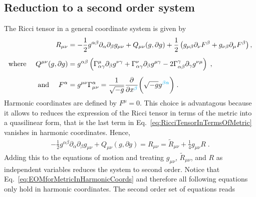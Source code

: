 \documentclass[a4paper,oneside,openany,11pt]{memoir}
\numberwithin{equation}{section} %
\newcommand{\aaron}[1]{{\color{cyan} #1}}
\begin{document}
\subsection{Reduction to a second order system}

The Ricci tensor in a general coordinate system is given by
\begin{align}
	\label{eq:RicciTensorInTermsOfMetric}
	R_{\mu\nu}&=-\frac{1}{2}g^{\alpha\beta}\partial_{\alpha}\partial_{\beta}g_{\mu\nu}+Q_{\mu\nu}(g,\partial g)+\frac{1}{2}
\left(g_{\mu\beta}\partial_\nu F^\beta+g_{\nu\beta}\partial_\mu F^\beta\right),
	\\[0.5em]\notag
	\text{where }\quad
	Q^{\mu\nu}(g,\partial g)&=g^{\alpha\beta}\left(\Gamma_{\alpha\gamma}^{\mu}\partial_{\beta} g^{\nu\gamma}+\Gamma_{\alpha\gamma}^{\nu}\partial_{\beta} g^{\mu\gamma}-2\Gamma_{\alpha\beta}^{\gamma}\partial_{\gamma} g^{\nu\mu}\right)\;,
	\\[0.5em]\notag
	\text{and }\quad
	F^\alpha &= g^{\mu\nu}\Gamma_{\mu\nu}^\alpha = \frac{1}{\sqrt{-g}}\frac{\partial}{\partial x^\aaron{\beta}}\bigg(\sqrt{-g}g^{\aaron{\beta\alpha}}\bigg)\;.
\end{align}
Harmonic coordinates are defined by $F^{\mu} = 0$. This choice is advantagous because it allows to reduces the expression of the Ricci tensor in terms of the metric into a quasilinear form, that is the last term in Eq.~\eqref{eq:RicciTensorInTermsOfMetric} vanishes in harmonic coordinates. Hence, 
\begin{align}
	\label{eq:EOMforMetricInHarmonicCoords}
	-\frac{1}{2}g^{\alpha\beta}\partial_{\alpha}\partial_{\beta}g_{\mu\nu}+Q_{\mu\nu}(g,\partial g) = R_{\mu\nu} = \widetilde{R}_{\mu\nu}
+\frac{1}{4}g_{\mu\nu}R\;.
\end{align}
Adding this to the equations of motion and treating $g_{\mu\nu}$, $\widetilde{R}_{\mu\nu}$, and $R$ as independent variables reduces the system to second order. Notice that Eq.~\eqref{eq:EOMforMetricInHarmonicCoords} and therefore all following equations only hold in harmonic coordinates. The second order set of equations reads
\end{document}
